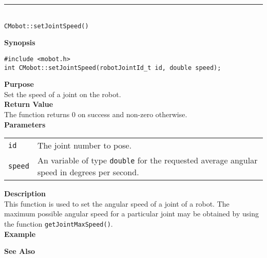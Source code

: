 \noindent
\vspace{5pt}
\rule{4.5in}{0.015in}\\
\noindent
{\LARGE \texttt{CMobot::setJointSpeed()}}\\
{}

\noindent
{\bf Synopsis}
\vspace{-8pt}
\begin{verbatim}
#include <mobot.h>
int CMobot::setJointSpeed(robotJointId_t id, double speed);
\end{verbatim}

\noindent
{\bf Purpose}\\
Set the speed of a joint on the robot.\\

\noindent
{\bf Return Value}\\
The function returns 0 on success and non-zero otherwise.\\

\noindent
{\bf Parameters}
\vspace{-0.1in}
\begin{description}
\item               
\begin{tabular}{p{10 mm}p{145 mm}}
\texttt{id} & The joint number to pose. \\
\texttt{speed} & An variable of type \texttt{double} for the requested average
angular speed in degrees per second.
\end{tabular}
\end{description}

\noindent
{\bf Description}\\
This function is used to set the angular speed of a joint of a robot. The
maximum possible angular speed for a particular joint may be obtained
by using the function \texttt{getJointMaxSpeed()}.
\noindent\\
{\bf Example}\\
\noindent

\noindent
{\bf See Also}\\

